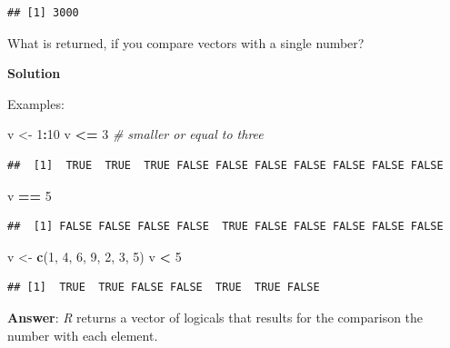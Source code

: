 \documentclass[
]{scrartcl}
\makeatletter
\newenvironment{Shaded}{\begin{snugshade}}{\end{snugshade}}
\newcommand{\CommentTok}[1]{\textcolor[rgb]{0.56,0.35,0.01}{\textit{#1}}}
\newcommand{\DecValTok}[1]{\textcolor[rgb]{0.00,0.00,0.81}{#1}}
\newcommand{\KeywordTok}[1]{\textcolor[rgb]{0.13,0.29,0.53}{\textbf{#1}}}
\newcommand{\NormalTok}[1]{#1}
\newcommand{\OperatorTok}[1]{\textcolor[rgb]{0.81,0.36,0.00}{\textbf{#1}}}
\newcommand{\StringTok}[1]{\textcolor[rgb]{0.31,0.60,0.02}{#1}}
\newenvironment{kframe}{%
\medskip{}
\setlength{\fboxsep}{.8em}
 \def\at@end@of@kframe{}%
 \ifinner\ifhmode%
  \def\at@end@of@kframe{\end{minipage}}%
  \begin{minipage}{\columnwidth}%
 \fi\fi%
 \def\FrameCommand##1{\hskip\@totalleftmargin \hskip-\fboxsep
 \colorbox{shadecolor}{##1}\hskip-\fboxsep
     \hskip-\linewidth \hskip-\@totalleftmargin \hskip\columnwidth}%
 \MakeFramed {\advance\hsize-\width
   \@totalleftmargin\z@ \linewidth\hsize
   \@setminipage}}%
 {\par\unskip\endMakeFramed%
 \at@end@of@kframe}
\newenvironment{rmdblock}[1]
  {
  \begin{itemize}
  \renewcommand{\labelitemi}{
    \raisebox{-.7\height}[0pt][0pt]{
      {\setkeys{Gin}{width=3em,keepaspectratio}\texttt{[image: images/\#1]}}
    }
  }
  \setlength{\fboxsep}{1em}
  \begin{kframe}
  \item
  }
  {
  \end{kframe}
  \end{itemize}
  }
\newenvironment{myexercise}
    {\begin{rmdblock}{exercise_green}}
    {\end{rmdblock}}
\newenvironment{webexsolution}[1]
    {\par\tiny\textbf{#1}}
    {\par}
\newcommand{\webexhide}[1]{\begin{webexsolution}{#1}}
\newcommand{\webexunhide}{\end{webexsolution}}
\makeatother
\begin{document}
\begin{verbatim}
## [1] 3000
\end{verbatim}

\begin{myexercise}
What is returned, if you compare vectors with a single number?
\end{myexercise}
\webexhide{Solution}

Examples:

\begin{Shaded}
\begin{Highlighting}[]
\NormalTok{v \textless{}{-}}\StringTok{ }\DecValTok{1}\OperatorTok{:}\DecValTok{10}
\NormalTok{v }\OperatorTok{\textless{}=}\StringTok{ }\DecValTok{3}   \CommentTok{\# smaller or equal to three}
\end{Highlighting}
\end{Shaded}

\begin{verbatim}
##  [1]  TRUE  TRUE  TRUE FALSE FALSE FALSE FALSE FALSE FALSE FALSE
\end{verbatim}

\begin{Shaded}
\begin{Highlighting}[]
\NormalTok{v }\OperatorTok{==}\StringTok{ }\DecValTok{5}
\end{Highlighting}
\end{Shaded}

\begin{verbatim}
##  [1] FALSE FALSE FALSE FALSE  TRUE FALSE FALSE FALSE FALSE FALSE
\end{verbatim}

\begin{Shaded}
\begin{Highlighting}[]
\NormalTok{v \textless{}{-}}\StringTok{ }\KeywordTok{c}\NormalTok{(}\DecValTok{1}\NormalTok{, }\DecValTok{4}\NormalTok{, }\DecValTok{6}\NormalTok{, }\DecValTok{9}\NormalTok{, }\DecValTok{2}\NormalTok{, }\DecValTok{3}\NormalTok{, }\DecValTok{5}\NormalTok{)}
\NormalTok{v }\OperatorTok{\textless{}}\StringTok{ }\DecValTok{5}
\end{Highlighting}
\end{Shaded}

\begin{verbatim}
## [1]  TRUE  TRUE FALSE FALSE  TRUE  TRUE FALSE
\end{verbatim}

\textbf{Answer}: \emph{R} returns a vector of logicals that results for the comparison the number with each element.
\webexunhide
\end{document}
